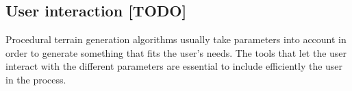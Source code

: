 



\subsection{User interaction [TODO]}
Procedural terrain generation algorithms usually take parameters into account in order to generate something that fits the user's needs. The tools that let the user interact with the different parameters are essential to include efficiently the user in the process. 

